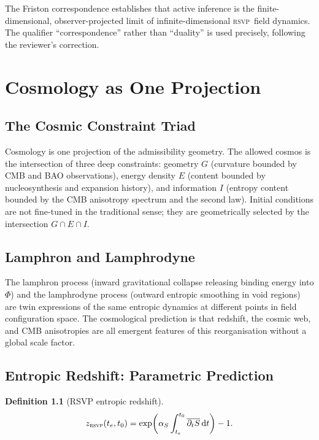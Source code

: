 \documentclass[12pt, oneside]{book}
\theoremstyle{plain}
\theoremstyle{definition}
\newtheorem{definition}[theorem]{Definition}
\newcommand{\RSVP}{\textsc{rsvp}}
\newcommand{\dd}{\mathrm{d}}
\begin{document}
The Friston correspondence establishes that active inference is the finite-dimensional,
observer-projected limit of infinite-dimensional \RSVP\ field dynamics. The qualifier
``correspondence'' rather than ``duality'' is used precisely, following the reviewer's
correction.

\chapter{Cosmology as One Projection}
\label{ch:cosmo}

\section{The Cosmic Constraint Triad}
\label{sec:triad}

Cosmology is one projection of the admissibility geometry. The allowed cosmos is
the intersection of three deep constraints: geometry $G$ (curvature bounded by CMB
and BAO observations), energy density $E$ (content bounded by nucleosynthesis and
expansion history), and information $I$ (entropy content bounded by the CMB
anisotropy spectrum and the second law). Initial conditions are not fine-tuned in
the traditional sense; they are geometrically selected by the intersection
$G\cap E\cap I$.

\section{Lamphron and Lamphrodyne}
\label{sec:lamphron}

The lamphron process (inward gravitational collapse releasing binding energy into
$\Phi$) and the lamphrodyne process (outward entropic smoothing in void regions)
are twin expressions of the same entropic dynamics at different points in field
configuration space. The cosmological prediction is that redshift, the cosmic web,
and CMB anisotropies are all emergent features of this reorganisation without a
global scale factor.

\section{Entropic Redshift: Parametric Prediction}
\label{sec:redshift}

\begin{definition}[RSVP entropic redshift]
\[
  z_{\RSVP}(t_e, t_0) = \exp\!\left(\alpha_S
    \int_{t_e}^{t_0}\overline{\partial_t S}\, \dd t\right) - 1.
\]
\end{definition}
\end{document}
